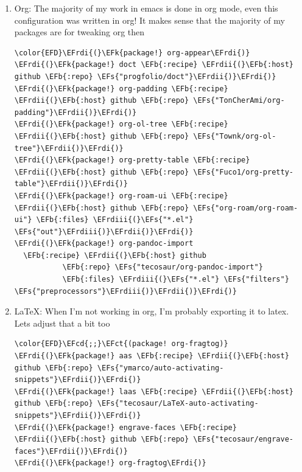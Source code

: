 \documentclass{scrartcl}
\newcommand{\EFk}[1]{\textcolor{EFk}{#1}} %
\newcommand{\EFs}[1]{\textcolor{EFs}{#1}} %
\newcommand{\EFb}[1]{\textcolor{EFb}{#1}} %
\newcommand{\EFct}[1]{\textcolor{EFct}{#1}} %
\newcommand{\EFcd}[1]{\textcolor{EFcd}{#1}} %
\newcommand{\EFrdi}[1]{#1} %
\newcommand{\EFrdii}[1]{#1} %
\newcommand{\EFrdiii}[1]{#1} %
\begin{document}
\begin{enumerate}
\item Org:
\label{sec:org74525c7}
The majority of my work in emacs is done in org mode, even this configuration
was written in org! It makes sense that the majority of my packages are for
tweaking org then
\begin{Code}
\begin{Verbatim}[]
\color{EFD}\EFrdi{(}\EFk{package!} org-appear\EFrdi{)}
\EFrdi{(}\EFk{package!} doct \EFb{:recipe} \EFrdii{(}\EFb{:host} github \EFb{:repo} \EFs{"progfolio/doct"}\EFrdii{)}\EFrdi{)}
\EFrdi{(}\EFk{package!} org-padding \EFb{:recipe} \EFrdii{(}\EFb{:host} github \EFb{:repo} \EFs{"TonCherAmi/org-padding"}\EFrdii{)}\EFrdi{)}
\EFrdi{(}\EFk{package!} org-ol-tree \EFb{:recipe} \EFrdii{(}\EFb{:host} github \EFb{:repo} \EFs{"Townk/org-ol-tree"}\EFrdii{)}\EFrdi{)}
\EFrdi{(}\EFk{package!} org-pretty-table \EFb{:recipe} \EFrdii{(}\EFb{:host} github \EFb{:repo} \EFs{"Fuco1/org-pretty-table"}\EFrdii{)}\EFrdi{)}
\EFrdi{(}\EFk{package!} org-roam-ui \EFb{:recipe} \EFrdii{(}\EFb{:host} github \EFb{:repo} \EFs{"org-roam/org-roam-ui"} \EFb{:files} \EFrdiii{(}\EFs{"*.el"} \EFs{"out"}\EFrdiii{)}\EFrdii{)}\EFrdi{)}
\EFrdi{(}\EFk{package!} org-pandoc-import
  \EFb{:recipe} \EFrdii{(}\EFb{:host} github
           \EFb{:repo} \EFs{"tecosaur/org-pandoc-import"}
           \EFb{:files} \EFrdiii{(}\EFs{"*.el"} \EFs{"filters"} \EFs{"preprocessors"}\EFrdiii{)}\EFrdii{)}\EFrdi{)}
\end{Verbatim}
\end{Code}

\item \LaTeX:
\label{sec:org976ed08}
When I'm not working in org, I'm probably exporting it to latex. Lets adjust
that a bit too
\begin{Code}
\begin{Verbatim}[]
\color{EFD}\EFcd{;;}\EFct{(package! org-fragtog)}
\EFrdi{(}\EFk{package!} aas \EFb{:recipe} \EFrdii{(}\EFb{:host} github \EFb{:repo} \EFs{"ymarco/auto-activating-snippets"}\EFrdii{)}\EFrdi{)}
\EFrdi{(}\EFk{package!} laas \EFb{:recipe} \EFrdii{(}\EFb{:host} github \EFb{:repo} \EFs{"tecosaur/LaTeX-auto-activating-snippets"}\EFrdii{)}\EFrdi{)}
\EFrdi{(}\EFk{package!} engrave-faces \EFb{:recipe} \EFrdii{(}\EFb{:host} github \EFb{:repo} \EFs{"tecosaur/engrave-faces"}\EFrdii{)}\EFrdi{)}
\EFrdi{(}\EFk{package!} org-fragtog\EFrdi{)}
\end{Verbatim}
\end{Code}


\end{enumerate}
\end{document}
